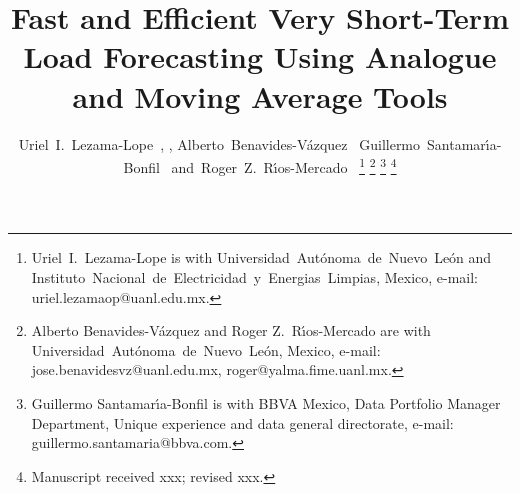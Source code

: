 \documentclass[journal, twoside]{IEEEtran}
\newcommand\icon[1]{\href{https://.org/#1}{\mbox{\scalerel*{
\begin{tikzpicture}[yscale=-1,transform shape]
\pic{logo};
\end{tikzpicture}
}{|}}}}
\begin{document}
 

 \setcounter{page}{1}%
%
\title{Fast and Efficient Very Short-Term Load Forecasting Using Analogue and Moving Average Tools}
%
%

\author{Uriel~I.~Lezama-Lope   \icon{0000-0002-3541-7194}\,, , 
   Alberto~Benavides-V\'azquez \icon{000-0002-4823-8830}\, 
   Guillermo~Santamar\'{\i}a-Bonfil \icon{0000-0003-4302-4902}\,
   and~Roger~Z.~R\'{\i}os-Mercado \icon{0000-0003-1053-5183}\,%
\thanks{Uriel~I.~Lezama-Lope is with
  Universidad~Aut\'onoma~de~Nuevo~Le\'on and
  Instituto~Nacional~de~Electricidad~y~Energias~Limpias, Mexico,
  e-mail: uriel.lezamaop@uanl.edu.mx.}%
\thanks{Alberto Benavides-V\'azquez and Roger Z.~R\'{\i}os-Mercado are
  with Universidad~Aut\'onoma~de~Nuevo~Le\'on, Mexico,
  e-mail: jose.benavidesvz@uanl.edu.mx, roger@yalma.fime.uanl.mx.}%
\thanks{Guillermo Santamar\'{\i}a-Bonfil is with BBVA Mexico, Data Portfolio Manager Department, Unique experience and data general directorate, e-mail: guillermo.santamaria@bbva.com.}%
\thanks{Manuscript received xxx; revised xxx.}}

\end{document}
